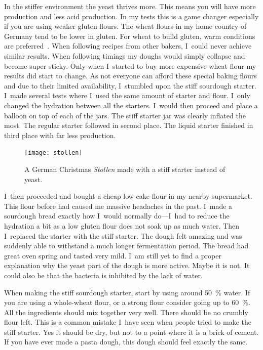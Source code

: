 In the stiffer environment the yeast thrives more. This means you will have
more  production and less acid production. In my tests this is a game
changer especially if you are using weaker gluten flours. The wheat flours in
my home country of Germany tend to be lower in gluten. For wheat to build gluten, warm conditions
are preferred~\cite{gluten+development+temperatures}. When following recipes
from other bakers, I~could never achieve similar results. When following
timings my doughs would
simply collapse and become super sticky. Only when I~started to buy more
expensive wheat flour my results did start to change. As not everyone can afford
these special baking flours and due to their limited availability, I~stumbled upon the
stiff sourdough starter. I~made several tests where I~used the same amount of
starter and flour. I~only changed the hydration between all the starters.
I~would then proceed and place a balloon on top of each of the jars. The stiff
starter jar was clearly inflated the most. The regular starter
followed in second place. The liquid starter finished in third place with far less 
production.

\begin{figure}[!htb]
  \texttt{[image: stollen]}
  \caption[Christmas \emph{Stollen}]{A German Christmas \emph{Stollen} made
      with a stiff starter instead of yeast.}%
  \label{fig:stollen}
\end{figure}

I~then proceeded and bought a cheap low cake flour in my nearby supermarket.
This flour before had caused me massive headaches in the past. I~made a sourdough bread
exactly how I~would normally do---I~had to reduce the hydration a bit as a low
gluten flour does not soak up as much water. Then I~replaced the starter with
the stiff starter. The dough felt amazing and was suddenly able to withstand a
much longer fermentation period. The bread had great oven spring and tasted
very mild. I~am still yet to find a proper explanation why the yeast part of
the dough is more active. Maybe it is not. It could also be that the bacteria
is inhibited by the lack of water.

When making the stiff sourdough starter, start by using around \qty{50}{\percent}
water. If you are using a whole-wheat flour, or a strong flour consider going
up to \qty{60}{\percent}. All the ingredients should mix together very well. There
should be no crumbly flour left. This is a common mistake I~have seen when
people tried to make the stiff starter. Yes it should be dry, but not to a
point where it is a brick of cement. If you have ever made a pasta dough, this
dough should feel exactly the same.

